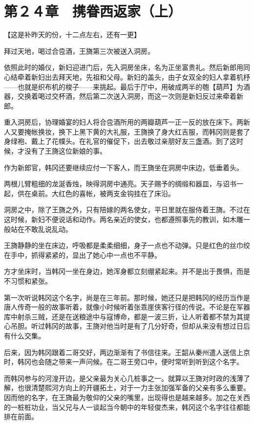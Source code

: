 \section{第２４章　携眷西返家（上）}

【这是补昨天的份，十二点左右，还有一更】

拜过天地，喝过合卺酒，王旖第三次被送入洞房。

依照此时的婚仪，新妇迎进门后，先入洞房坐床，名为正坐富贵礼。然后新郎用同心结牵着新妇出去拜天地，先祖和父母。新妇的盖头，由子女双全的妇人拿着机杼——也就是织布机的梭子——来挑起。最后于厅中，用破成两半的匏【葫芦】为酒器，交换着喝过交杯酒，然后第二次送入洞房，而这一次则是新妇反过来牵着新郎。

重入洞房后，协理婚宴的妇人将合卺酒所用的两瓣葫芦一正一反的放在床下。两新人又要掩帐换妆，换下上黑下黄的大礼服，王旖换了身大红吉服，而韩冈则是套了身绿袍、戴上了花幞头。在礼官的催促下，出去敬过亲朋好友三盏酒。到了这时候，才没有了王旖这位新娘的事。

作为新郎官，韩冈还要继续应付一下客人，而王旖坐在洞房中床边，低垂着头。

两根儿臂粗细的龙涎香烛，映得洞房中通亮。天子赐予的绸缎和器皿，与诏书一起，供在桌前。大红色的喜帐，被两支金钩挂在了床沿。

洞房之中，除了王旖之外，只有陪嫁的两名使女，平日里就在服侍着王旖。不过在这时候，新妇不便说话和动作。两名亲近的使女，也都遵照事先的教训，如木雕一般站在不敢乱说乱动。

王旖静静的坐在床边，呼吸都是柔柔细细，身子一点也不动弹。只是红色的丝巾绞在手中，抓得紧紧的，显出了她心中一点也不平静。

方才坐床时，当韩冈一坐在身边，她浑身都立刻绷紧起来。并不是出于畏惧，而是不习惯和紧张。

第一次听说韩冈这个名字，尚是在三年前。那时候，她还只是把韩冈的经历当作是唐人传奇一般的故事听着，就像小时候听着张乖崖侠客行径的传说。不论是在军器库中射杀三贼，还是在送粮途中与寇博命，都是一波三折，让人听着都不禁为其提心吊胆。听过韩冈的故事，王旖对他当时是有了几分好奇，但却从来没有想过日后有什么交集。

后来，因为韩冈跟着二哥交好，两边渐渐有了书信往来。王韶从秦州遣人送信上京时，韩冈也会随之带来一声问候。在二哥王旁口中，便时常听到听到这个名字。

而韩冈参与的河湟开边，是父亲最为关心几桩事之一。就算以王旖对时政的浅薄了解，也很清楚熙河方向上的开疆拓土，对于一力主张加强军备的父亲有多么重要。因而他的名字，在王旖最为敬仰的父亲的嘴里，出现得也是越来越多。加之在关西的一桩桩功业，当父兄与人一谈起当今朝中的年轻俊杰来，韩冈这个名字往往都能排在前面。

